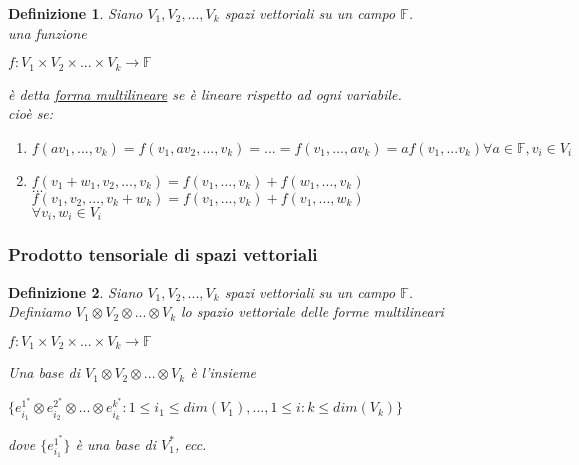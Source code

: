 \documentclass[a4paper,12pt]{article}
\theoremstyle{def}
\newtheorem*{definition}{Definizione}
\theoremstyle{prop}
\theoremstyle{esempio}
\theoremstyle{dimostrazione}
\theoremstyle{teo}
\theoremstyle{osservazione}
\begin{document}
\newpage

\begin{definition}
	Siano \(V_1, V_2, ..., V_k\) spazi vettoriali su un campo \(\mathbb{F}\).\\
	una funzione
	\begin{center}
		\(f : V_1 \times V_2 \times ... \times V_k \rightarrow \mathbb{F}\)
	\end{center}
	è detta \underline{forma multilineare} se è lineare rispetto ad ogni variabile.\\
	cioè se:
	\begin{enumerate}
		\item \(f(av_1, ... ,v_k) = f(v_1, a v_2, ..., v_k) = ... = f(v_1, ..., a v_k) = a f(v_1, ... v_k) \forall a \in \mathbb{F}, v_i \in V_i\)
		\item \(f(v_1 + w_1, v_2, ... ,v_k) = f(v_1, ..., v_k) + f(w_1, ..., v_k)\)\\
		      \(...\)\\
		      \(f(v_1, v_2, ... ,v_k + w_k) = f(v_1, ..., v_k) + f(v_1, ..., w_k)\)\\
		      \(\forall v_i, w_i \in V_i\)
	\end{enumerate}
\end{definition}

\subsubsection{Prodotto tensoriale di spazi vettoriali}
\begin{definition}
	Siano \(V_1, V_2, ..., V_k\) spazi vettoriali su un campo \(\mathbb{F}\).\\
	Definiamo \(V_1 \otimes V_2 \otimes ... \otimes V_k\)  lo spazio vettoriale delle forme multilineari\\
	\begin{center}
		\(f : V_1 \times V_2 \times ... \times V_k \rightarrow \mathbb{F}\)
	\end{center}
	Una base di \(V_1 \otimes V_2 \otimes ... \otimes V_k\) è l'insieme
	\begin{center}
		\(\{e_{i_1}^{1^*} \otimes e_{i_2}^{2^*} \otimes ... \otimes e_{i_k}^{k^*} : 1 \leq i_1 \leq dim(V_1), ... , 1 \leq i:k \leq dim(V_k)\}\)
	\end{center}
	dove \(\{e_{i_1}^{1^*}\}\) è una base di \(V_1^*\), ecc.\\
\end{definition}

\newpage
\end{document}
